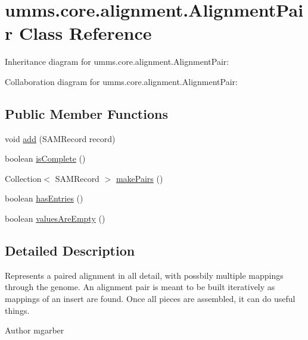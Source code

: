 \hypertarget{classumms_1_1core_1_1alignment_1_1_alignment_pair}{\section{umms.\+core.\+alignment.\+Alignment\+Pair Class Reference}
\label{classumms_1_1core_1_1alignment_1_1_alignment_pair}
}


Inheritance diagram for umms.\+core.\+alignment.\+Alignment\+Pair\+:


Collaboration diagram for umms.\+core.\+alignment.\+Alignment\+Pair\+:
\subsection*{Public Member Functions}
\begin{DoxyCompactItemize}
\item 
void \hyperlink{classumms_1_1core_1_1alignment_1_1_alignment_pair_a35848e8e754d57d88cade0a8a4c8cfa1}{add} (S\+A\+M\+Record record)
\item 
boolean \hyperlink{classumms_1_1core_1_1alignment_1_1_alignment_pair_ae7b309f8b45628e21a057aaa45d09d1d}{is\+Complete} ()
\item 
Collection$<$ S\+A\+M\+Record $>$ \hyperlink{classumms_1_1core_1_1alignment_1_1_alignment_pair_aee8a344eb7c324f23c0b68685f5a3ebf}{make\+Pairs} ()
\item 
boolean \hyperlink{classumms_1_1core_1_1alignment_1_1_alignment_pair_a2aa94dac5797f73522d15b24febbe137}{has\+Entries} ()
\item 
boolean \hyperlink{classumms_1_1core_1_1alignment_1_1_alignment_pair_ae3e2b4922d5a6fd89fd115261cc4f821}{values\+Are\+Empty} ()
\end{DoxyCompactItemize}


\subsection{Detailed Description}
Represents a paired alignment in all detail, with possbily multiple mappings through the genome. An alignment pair is meant to be built iteratively as mappings of an insert are found. Once all pieces are assembled, it can do useful things. \begin{DoxyAuthor}{Author}
mgarber 
\end{DoxyAuthor}


